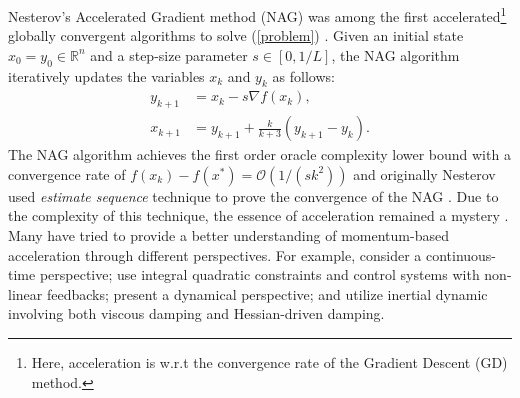 \documentclass{article}
\theoremstyle{plain}
\theoremstyle{definition}
\theoremstyle{remark}
\newcommand{\aynote}[1]{\textcolor{red}{[\textbf{Note:} #1]}}
\begin{document}
Nesterov's Accelerated Gradient method (NAG) was among the first accelerated\footnote{Here, acceleration is w.r.t the convergence rate of the Gradient Descent (GD) method.} globally convergent algorithms to solve (\ref{problem}) \citep{Nesterov1983AMF}. 
Given an initial state $x_0 = y_0 \in \mathbb{R}^n$ and a step-size parameter $s \in [0, 1/L]$, the NAG algorithm iteratively updates the variables $x_k$ and $y_k$ as follows:
\begin{equation}\label{eqn_Nest_alg}
\begin{aligned}
    y_{k+1}&=x_k -s\nabla f(x_k), \\
    x_{k+1}&= y_{k+1}+\frac{k}{k+3} (y_{k+1}-y_{k}).
\end{aligned}
\end{equation}
The NAG algorithm achieves the first order oracle complexity lower bound with a convergence rate of \(f(x_k)-f(x^*)=\mathcal O (1/(sk^2))\) and originally Nesterov used \textit{estimate sequence} technique to prove the convergence of the NAG \citep{nesterov2003introductory}. Due to the complexity of this technique, the essence of acceleration remained a mystery \citep{hu2017dissipativity}. Many have tried to provide a better understanding of momentum-based acceleration through different perspectives. For example, \citet{JMLR:v17:15-084,shi2019acceleration,Shi2021UnderstandingTA,sanz2021connections} consider a continuous-time perspective; \citet{Lessard2016AnalysisAD,doi:10.1137/17M1136845} use integral quadratic constraints and control systems with non-linear feedbacks; \citet{muehlebach2019dynamical,muehlebach2022constraints,muehlebach2023accelerated} present a dynamical perspective; and \citet{attouch2020first,attouch2021convergence} utilize inertial dynamic involving both viscous damping and Hessian-driven damping. 
\end{document}
